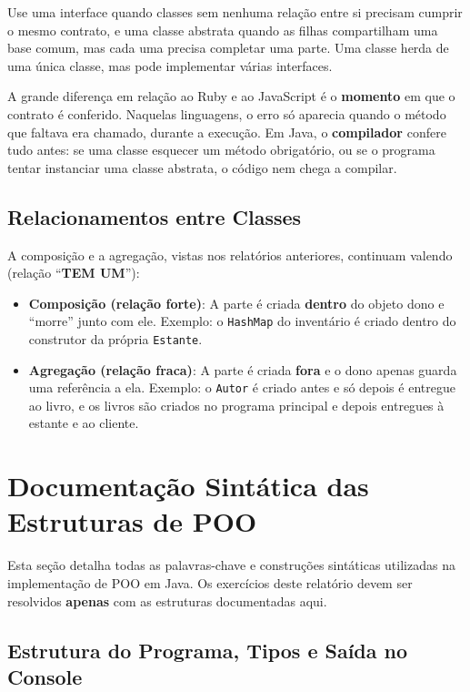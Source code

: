 Use uma interface quando classes sem nenhuma relação entre si precisam cumprir o mesmo contrato,
e uma classe abstrata quando as filhas compartilham uma base comum, mas cada uma precisa
completar uma parte. Uma classe herda de uma única classe, mas pode implementar várias
interfaces.

A grande diferença em relação ao Ruby e ao JavaScript é o \textbf{momento} em que o contrato é
conferido. Naquelas linguagens, o erro só aparecia quando o método que faltava era chamado,
durante a execução. Em Java, o \textbf{compilador} confere tudo antes: se uma classe esquecer
um método obrigatório, ou se o programa tentar instanciar uma classe abstrata, o código nem
chega a compilar.

\subsection{Relacionamentos entre Classes}

A composição e a agregação, vistas nos relatórios anteriores, continuam valendo (relação
``\textbf{TEM UM}''):

\begin{itemize}
    \item \textbf{Composição (relação forte)}: A parte é criada \textbf{dentro} do objeto dono e
    ``morre'' junto com ele. Exemplo: o \texttt{HashMap} do inventário é criado dentro do
    construtor da própria \texttt{Estante}.

    \item \textbf{Agregação (relação fraca)}: A parte é criada \textbf{fora} e o dono apenas
    guarda uma referência a ela. Exemplo: o \texttt{Autor} é criado antes e só depois é entregue
    ao livro, e os livros são criados no programa principal e depois entregues à estante e ao
    cliente.
\end{itemize}

\section{Documentação Sintática das Estruturas de POO}

Esta seção detalha todas as palavras-chave e construções sintáticas utilizadas na implementação
de POO em Java. Os exercícios deste relatório devem ser resolvidos \textbf{apenas} com as
estruturas documentadas aqui.

\subsection{Estrutura do Programa, Tipos e Saída no Console}

